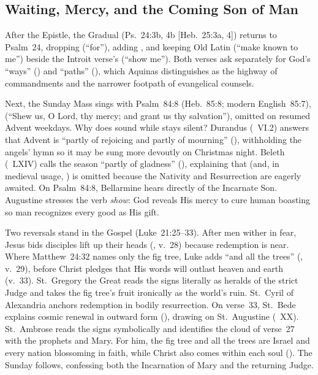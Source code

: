 \subsection{Waiting, Mercy, and the Coming Son of Man}

After the Epistle, the Gradual (Ps.~24:3b, 4b [Heb.~25:3a, 4]) returns to Psalm~24, dropping  (``for''), adding , and keeping Old Latin  (``make known to me'') beside the Introit verse's  (``show me''). Both verses ask separately for God's ``ways'' () and ``paths'' (), which Aquinas distinguishes as the highway of commandments and the narrower footpath of evangelical counsels.

Next, the Sunday Mass sings  with Psalm~84:8 (Heb.~85:8; modern English~85:7),  (``Shew us, O Lord, thy mercy; and grant us thy salvation''), omitted on resumed Advent weekdays. Why does  sound while  stays silent? Durandus (~VI.2) answers that Advent is ``partly of rejoicing and partly of mourning'' (), withholding the angels' hymn so it may be sung more devoutly on Christmas night. Beleth (~LXIV) calls the season ``partly of gladness'' (), explaining that  (and, in medieval usage, ) is omitted because the Nativity and Resurrection are eagerly awaited. On Psalm~84:8, Bellarmine hears  directly of the Incarnate Son. Augustine stresses the verb \emph{show}: God reveals His mercy to cure human boasting so man recognizes every good as His gift.

Two reversals stand in the Gospel (Luke~21:25--33). After men wither in fear, Jesus bids disciples lift up their heads (, v.~28) because redemption is near. Where Matthew~24:32 names only the fig tree, Luke adds ``and all the trees'' (, v.~29), before Christ pledges that His words will outlast heaven and earth (v.~33). St.~Gregory the Great reads the signs literally as heralds of the strict Judge and takes the fig tree's fruit ironically as the world's ruin. St.~Cyril of Alexandria anchors redemption in bodily resurrection. On verse~33, St.~Bede explains cosmic renewal in outward form (), drawing on St.~Augustine (~XX). St.~Ambrose reads the signs symbolically and identifies the cloud of verse~27 with the prophets and Mary. For him, the fig tree and all the trees are Israel and every nation blossoming in faith, while Christ also comes within each soul (). The Sunday  follows, confessing both the Incarnation of Mary and the returning Judge.

